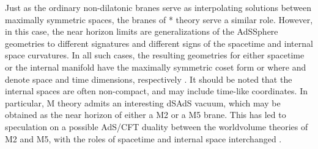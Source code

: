 \documentclass[a4paper,12pt]{article}
\begin{document}
Just as the ordinary non-dilatonic branes serve as interpolating
solutions between maximally symmetric spaces, the branes of * theory
serve a similar role.  However, in this case, the near horizon limits
are generalizations of the AdS\myHighlight{$\times$}\coordHE{}Sphere geometries to different
signatures and different signs of the spacetime and internal space
curvatures.  In all such cases, the resulting geometries for either
spacetime or the internal manifold have the maximally symmetric coset
form \coordHE{} or \coordHE{} where \coordHE{} and \coordHE{} denote
space and time dimensions, respectively \cite{Hull4}.  It should be
noted that the internal spaces are often non-compact, and may include
time-like coordinates.  In particular, M\myHighlight{$^*$}\coordHE{} theory admits
an interesting dS\myHighlight{$_4\times$}\coordHE{}AdS\coordHE{} vacuum, which may be obtained as the
near horizon of either a M2 \coordHE{} or a M5 \coordHE{} brane.  This has
led to speculation on a possible AdS/CFT duality between the worldvolume
theories of M2 and M5, with the roles of spacetime and internal space
interchanged \cite{Batrachenko:2002pu}.
\end{document}
